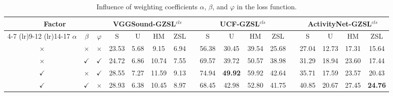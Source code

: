 \documentclass[lettersize,journal]{IEEEtran}
\begin{document}
\begin{table}[!t]
  \centering
  \caption{Influence of weighting coefficients $\alpha$, $\beta$, and $\varphi$ in the loss function.}
  \label{tab:loss_coeff}
  \begin{tabular}{ccc cccc c cccc c cccc}
    \toprule[2pt]
    \multicolumn{3}{c}{\multirow{2}{*}{\textbf{Factor}}} 
    & \multicolumn{4}{c}{VGGSound-GZSL$^{\textit{cls}}$} & & \multicolumn{4}{c}{UCF-GZSL$^{\textit{cls}}$} & & \multicolumn{4}{c}{ActivityNet-GZSL$^{\textit{cls}}$} \\
    \cmidrule(lr){4-7} \cmidrule(lr){9-12} \cmidrule(lr){14-17}
    $\alpha$ & $\beta$ & $\varphi$ & S & U & HM & ZSL & & S & U & HM & ZSL & & S & U & HM & ZSL \\
    \midrule[1pt]
    $\times$ & $\times$ & $\times$ & 23.53 & 5.68 & 9.15 & 6.94 & & 56.38 & 30.45 & 39.54 & 25.68 & & 27.04 & 12.73 & 17.31 & 15.64 \\
    $\times$ & $\checkmark$ & $\checkmark$ & 24.72 & 6.86 & 10.74 & 7.55 & & 69.57 & 39.72 & 50.57 & 38.98 & & 31.29 & 18.94 & 23.60 & 17.44 \\
    $\checkmark$ & $\times$ & $\checkmark$ & 28.55 & 7.27 & 11.59 & 9.13 & & 74.94 & \textbf{49.92} & 59.92 & 42.64 & & 35.71 & 17.59 & 23.57 & 20.43 \\
    $\checkmark$ & $\checkmark$ & $\times$ & 28.93 & 6.38 & 10.45 & 8.97 & & 68.45 & 42.98 & 52.80 & 41.75 & & 40.85 & 20.67 & 27.45 & \textbf{24.76} \\
    

\end{tabular}
\end{table}
\end{document}
